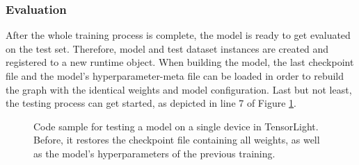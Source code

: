 \subsubsection*{Evaluation}

After the whole training process is complete, the model is ready to get evaluated on the test set. Therefore, model and test dataset instances are created and registered to a new runtime object. When building the model, the last checkpoint file and the model's hyperparameter-meta file can be loaded in order to rebuild the graph with the identical weights and model configuration. Last but not least, the testing process can get started, as depicted in line 7 of Figure \ref{code:runtime_eval}.

\begin{figure}[htpb]
  
  \caption[Code: Evaluation with TensorLight]{Code sample for testing a model on a single device in TensorLight. Before, it restores the checkpoint file containing all weights, as well as the model's hyperparameters of the previous training.}\label{code:runtime_eval}
\end{figure}
